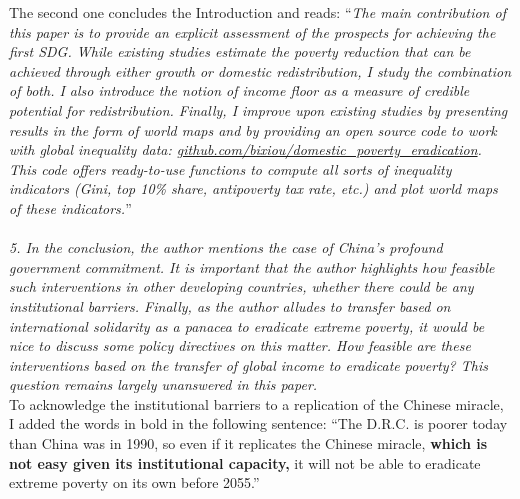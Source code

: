 \documentclass[12pt,english]{article}
\begin{document}
The second one concludes the Introduction and reads: ``\textit{The main contribution of this paper is to provide an explicit assessment of the prospects for achieving the first SDG. While existing studies estimate the poverty reduction that can be achieved through either growth or domestic redistribution, I study the combination of both. I also introduce the notion of \textit{income floor} as a measure of credible potential for redistribution. Finally, I improve upon existing studies by presenting results in the form of world maps and by providing an open source code to work with global inequality data: \href{https://github.com/bixiou/domestic_poverty_eradication}{github.com/bixiou/domestic\_poverty\_eradication}. This code offers ready-to-use functions to compute all sorts of inequality indicators (Gini, top 10\% share, antipoverty tax rate, etc.) and plot world maps of these indicators.}''
~\\ ~\\

\textit{5. In the conclusion, the author mentions the case of China's profound government commitment. It is important that the author highlights how feasible such interventions in other developing countries, whether there could be any institutional barriers. Finally, as the author alludes to transfer based on international solidarity as a panacea to eradicate extreme poverty, it would be nice to discuss some policy directives on this matter. How feasible are these interventions based on the transfer of global income to eradicate poverty? This question remains largely unanswered in this paper.}~\\

To acknowledge the institutional barriers to a replication of the Chinese miracle, I added the words in bold in the following sentence: ``The D.R.C. is poorer today than China was in 1990, 
so even if it replicates the Chinese miracle, \textbf{which is not easy given its institutional capacity,} it will not be able to eradicate extreme poverty on its own before 2055.''
\end{document}
